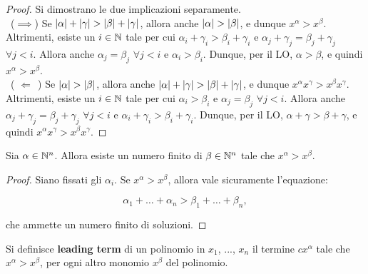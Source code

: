 \begin{proof}
    Si dimostrano le due implicazioni separamente. \\
    
    \ ($\implies$)\; Se $\left|\alpha\right| + \left|\gamma\right| > \left|\beta\right| + \left|\gamma\right|$, allora
    anche $\left|\alpha\right| > \left|\beta\right|$, e dunque
    $x^\alpha > x^\beta$. Altrimenti, esiste un $i \in \mathbb N$ tale
    per cui $\alpha_i + \gamma_i > \beta_i + \gamma_i$ e $\alpha_j + \gamma_j
    = \beta_j + \gamma_j$ $\forall j < i$. Allora
    anche $\alpha_j = \beta_j$ $\forall j < i$ e
    $\alpha_i > \beta_i$. Dunque, per il LO, $\alpha
    > \beta$, e quindi $x^\alpha > x^\beta$. \\
    
    \ ($\,\,\Longleftarrow\,\;$)\; Se $\left|\alpha\right| > \left|\beta\right|$, allora
    anche $\left|\alpha\right| + \left|\gamma\right| > \left|\beta\right| + \left|\gamma\right|$, e dunque
    $x^\alpha x^\gamma > x^\beta x^\gamma$. Altrimenti, esiste un $i \in \mathbb N$ tale
    per cui $\alpha_i > \beta_i$ e $\alpha_j = \beta_j$ $\forall j < i$. Allora
    anche $\alpha_j + \gamma_j = \beta_j + \gamma_j$ $\forall j < i$ e
    $\alpha_i + \gamma_i > \beta_i + \gamma_i$. Dunque, per il LO, $\alpha + \gamma
    > \beta + \gamma$, e quindi $x^\alpha x^\gamma > x^\beta x^\gamma$.
\end{proof}

\begin{proposition}
    \label{prop:numero_finito_soluzioni_deglex}

    Sia $\alpha \in \mathbb N^n$. Allora esiste un numero finito di $\beta \in \mathbb N^n$
    tale che $x^\alpha > x^\beta$.
\end{proposition}

\begin{proof}
    Siano fissati gli $\alpha_i$. Se $x^\alpha > x^\beta$,
    allora vale sicuramente l'equazione:
    
    \[ \alpha_1 + \ldots + \alpha_n > \beta_1 + \ldots + \beta_n, \]
    
    \vskip 0.1in
    
    che ammette un numero finito di soluzioni.
\end{proof}

\begin{definition}
    Si definisce \textbf{leading term} di un polinomio in
    $x_1$, ..., $x_n$ il termine $cx^\alpha$ tale che
    $x^\alpha > x^\beta$, per ogni altro monomio $x^\beta$
    del polinomio.
\end{definition}

